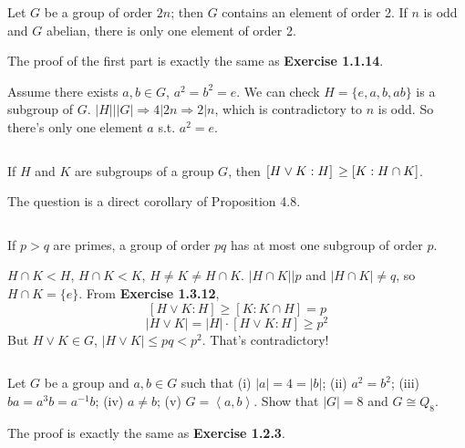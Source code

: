 \begin{ex}
    Let $G$ be a group of order $2n$; then $G$ contains an element of order 2. If $n$ is odd and $G$ abelian, there is only one element of order 2.
\end{ex}

\begin{answer}
    The proof of the first part is exactly the same as \textbf{Exercise 1.1.14}.

    Assume there exists $a, b\in G$, $a^{2}=b^{2}=e$. We can check $H=\{e,a,b,ab\}$ is a subgroup of $G$. $\left| H \right| | \left| G \right| \Rightarrow 4|2n\Rightarrow 2|n$, which is contradictory to $n$ is odd. So there's only one element $a$ s.t. $a^{2}=e$.
\end{answer}

$$ $$

\begin{ex}
    If $H$ and $K$ are subgroups of a group $G$, then $\left[H\vee K:H\right]\\\geq \left[K:H\cap K\right]$.
\end{ex}

\begin{answer}
    The question is a direct corollary of Proposition 4.8.
\end{answer}

$$ $$

\begin{ex}
    If $p>q$ are primes, a group of order $pq$ has at most one subgroup of order $p$.
\end{ex}

\begin{answer}
    $H\cap K<H$, $H\cap K<K$, $H\neq K\neq H\cap K$. $\left| H\cap K \right| |p$ and $\left| H\cap K \right| \neq q$, so $H\cap K=\{e\}$. From \textbf{Exercise 1.3.12}, \[\left[H\vee K:H\right]\geq \left[K:K\cap H\right]=p\]\[\left| H\vee K \right| =\left| H \right|\cdot \left[H\vee K:H\right]\geq p^{2}\] But $H\vee K\in G$, $\left| H\vee K \right| \leq pq<p^{2}$. That's contradictory!
\end{answer}

$$ $$

\begin{ex}
    Let $G$ be a group and $a,b\in G$ such that (i) $\left| a \right| =4=\left| b \right| $; (ii) $a^{2}=b^{2}$; (iii) $ba=a^{3}b=a^{-1}b$; (iv) $a\neq b$; (v) $G=\left\langle a,b\right\rangle$. Show that $\left| G \right| =8$ and $G\cong Q_{8}$.
\end{ex}

\begin{answer}
    The proof is exactly the same as \textbf{Exercise 1.2.3}.
\end{answer}